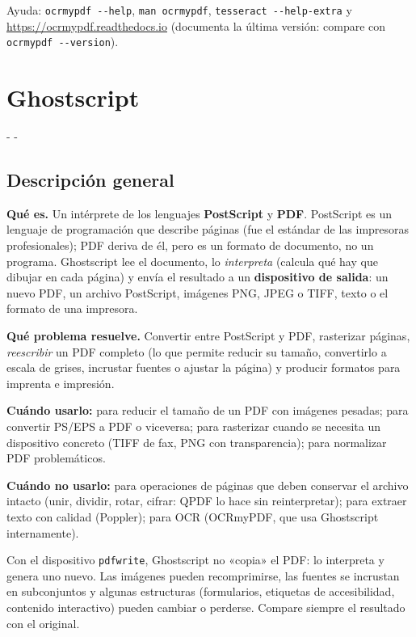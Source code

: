 \documentclass[11pt,a4paper]{article}
\makeatletter
\newcommand{\necesitaespacio}[1]{\par\penalty-100\begingroup
	\setlength{\dimen@}{#1}\dimen@ii\pagegoal\advance\dimen@ii-\pagetotal
	\ifdim\dimen@>\dimen@ii\ifdim\dimen@ii>\z@\vfil\fi\penalty-\@M\fi\endgroup}
\newcommand{\cmd}[1]{\texttt{\textcolor{colcmd}{#1}}}      %
\makeatother
\begin{document}
	Ayuda: \cmd{ocrmypdf -{}-help}, \cmd{man ocrmypdf}, \cmd{tesseract -{}-help-extra} y \url{https://ocrmypdf.readthedocs.io} (documenta la última versión: compare con \cmd{ocrmypdf -{}-version}).
	\clearpage
	\section{Ghostscript}\label{sec:ghostscript}
	
	\necesitaespacio{8\baselineskip}
	\subsection{Descripción general}
	
	\textbf{Qué es.} Un intérprete de los lenguajes \textbf{PostScript} y \textbf{PDF}. PostScript es un lenguaje de programación que describe páginas (fue el estándar de las impresoras profesionales); PDF deriva de él, pero es un formato de documento, no un programa. Ghostscript lee el documento, lo \emph{interpreta} (calcula qué hay que dibujar en cada página) y envía el resultado a un \textbf{dispositivo de salida}: un nuevo PDF, un archivo PostScript, imágenes PNG, JPEG o TIFF, texto o el formato de una impresora.
	
	\textbf{Qué problema resuelve.} Convertir entre PostScript y PDF, rasterizar páginas, \emph{reescribir} un PDF completo (lo que permite reducir su tamaño, convertirlo a escala de grises, incrustar fuentes o ajustar la página) y producir formatos para imprenta e impresión.
	
	\textbf{Cuándo usarlo:} para reducir el tamaño de un PDF con imágenes pesadas; para convertir PS/EPS a PDF o viceversa; para rasterizar cuando se necesita un dispositivo concreto (TIFF de fax, PNG con transparencia); para normalizar PDF problemáticos.
	
	\textbf{Cuándo no usarlo:} para operaciones de páginas que deben conservar el archivo intacto (unir, dividir, rotar, cifrar: QPDF lo hace sin reinterpretar); para extraer texto con calidad (Poppler); para OCR (OCRmyPDF, que usa Ghostscript internamente).
	
	\begin{importante}
		Con el dispositivo \texttt{pdfwrite}, Ghostscript no «copia» el PDF: lo interpreta y genera uno nuevo. Las imágenes pueden recomprimirse, las fuentes se incrustan en subconjuntos y algunas estructuras (formularios, etiquetas de accesibilidad, contenido interactivo) pueden cambiar o perderse. Compare siempre el resultado con el original.
	\end{importante}
	
\end{document}
